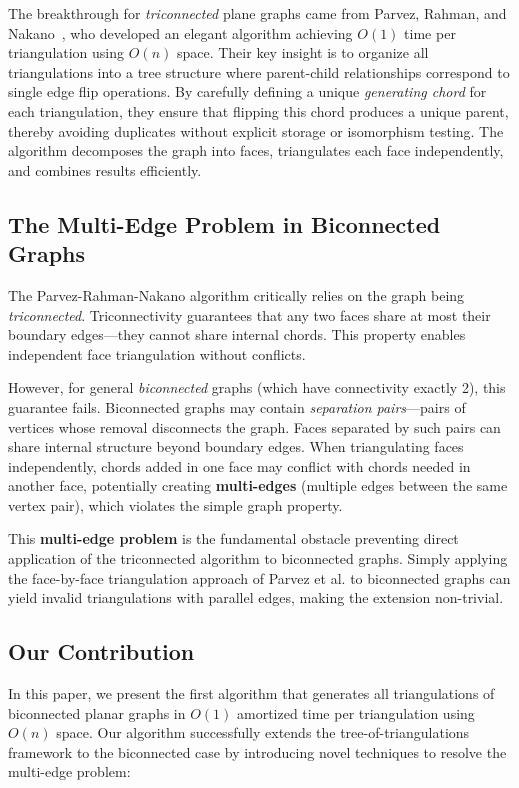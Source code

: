 \documentclass[12pt,a4paper]{article}
\theoremstyle{definition}
\theoremstyle{remark}
\begin{document}
The breakthrough for \emph{triconnected} plane graphs came from Parvez, Rahman, and Nakano~\cite{parvez2011}, who developed an elegant algorithm achieving $O(1)$ time per triangulation using $O(n)$ space. Their key insight is to organize all triangulations into a tree structure where parent-child relationships correspond to single edge flip operations. By carefully defining a unique \emph{generating chord} for each triangulation, they ensure that flipping this chord produces a unique parent, thereby avoiding duplicates without explicit storage or isomorphism testing. The algorithm decomposes the graph into faces, triangulates each face independently, and combines results efficiently.

\subsection{The Multi-Edge Problem in Biconnected Graphs}
\label{subsec:multiedge}

The Parvez-Rahman-Nakano algorithm critically relies on the graph being \emph{triconnected}. Triconnectivity guarantees that any two faces share at most their boundary edges—they cannot share internal chords. This property enables independent face triangulation without conflicts.

However, for general \emph{biconnected} graphs (which have connectivity exactly 2), this guarantee fails. Biconnected graphs may contain \emph{separation pairs}—pairs of vertices whose removal disconnects the graph. Faces separated by such pairs can share internal structure beyond boundary edges. When triangulating faces independently, chords added in one face may conflict with chords needed in another face, potentially creating \textbf{multi-edges} (multiple edges between the same vertex pair), which violates the simple graph property.

This \textbf{multi-edge problem} is the fundamental obstacle preventing direct application of the triconnected algorithm to biconnected graphs. Simply applying the face-by-face triangulation approach of Parvez et al. to biconnected graphs can yield invalid triangulations with parallel edges, making the extension non-trivial.

\subsection{Our Contribution}

In this paper, we present the first algorithm that generates all triangulations of biconnected planar graphs in $O(1)$ amortized time per triangulation using $O(n)$ space. Our algorithm successfully extends the tree-of-triangulations framework to the biconnected case by introducing novel techniques to resolve the multi-edge problem:
\end{document}
